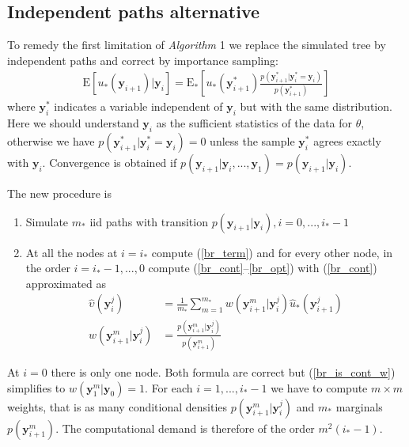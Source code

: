 \documentclass[11pt]{article}
\begin{document}
\subsection{Independent paths alternative}
To remedy the first limitation of \textit{Algorithm} 1 we replace the simulated tree by independent paths and correct by importance sampling:
\begin{align}
\mathrm{E}[u_*(\mathbf{y}_{i+1})|\mathbf{y}_i]=\mathrm{E}_*[u_*(\mathbf{y}_{i+1}^*)\frac{p(\mathbf{y}_{i+1}^*|\mathbf{y}_i^*=\mathbf{y}_i)}{p(\mathbf{y}_{i+1}^*)}]
\end{align} where $\mathbf{y}_i^*$ indicates a variable independent of $\mathbf{y}_i$ but with the same distribution. Here we should understand $\mathbf{y}_i$ as the sufficient statistics of the data for $\theta$, otherwise we have $p(\mathbf{y}_{i+1}^*|\mathbf{y}_{i}^*=\mathbf{y}_i)=0$ unless the sample $\mathbf{y}_{i}^*$ agrees exactly with $\mathbf{y}_i$. Convergence is obtained if $p(\mathbf{y}_{i+1}|\mathbf{y}_i,...,\mathbf{y}_1)=p(\mathbf{y}_{i+1}|\mathbf{y}_i)$\cite[Section 8.5.1]{glas2004}.

The new procedure is
\theoremstyle{remark}
\begin{algorithm}[BR]\label{alg:BR}
\hfill\par
\begin{enumerate}
\item Simulate $m_*$ iid paths with transition $p(\mathbf{y}_{i+1}|\mathbf{y}_i), i=0,...,i_*-1$\\
\item At all the nodes at $i=i_*$ compute (\ref{br_term}) and for every other node, in the order $i=i_*-1,...,0$ compute (\ref{br_cont}--\ref{br_opt}) with (\ref{br_cont}) approximated as 
\begin{align}\label{br_is_cont_approx}
\hat \upsilon(\mathbf{y}_i^{j})&=\frac{1}{m_*}\sum_{m=1}^{m_*} w(\mathbf{y}_{i+1}^m|\mathbf{y}_i^j)\hat u_*(\mathbf{y}_{i+1}^{j})\\\label{br_is_cont_w}
w(\mathbf{y}_{i+1}^m|\mathbf{y}_i^j)&=\frac{p(\mathbf{y}_{i+1}^m|\mathbf{y}_{i}^j)}{p(\mathbf{y}_{i+1}^m)}
\end{align}
\end{enumerate}
\end{algorithm}At $i=0$ there is only one node. Both formula are correct but (\ref{br_is_cont_w}) simplifies to  $w(\mathbf{y}_{1}^m|\mathbf{y}_0)=1$. For each $i=1,...,i_*-1$ we have to compute 
$m\times m$ weights, that is as many conditional densities $p(\mathbf{y}_{i+1}^m|\mathbf{y}_{i}^j)$ and $m_*$ marginals $p(\mathbf{y}_{i+1}^m)$. The computational demand is therefore of the order $m^2(i_*-1)$.
\end{document}
